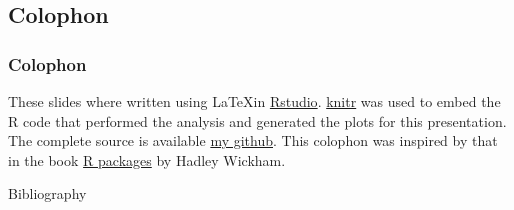 \documentclass{beamer}\usepackage{knitr}
\begin{document}
\subsection{Colophon}

\begin{frame}
\frametitle{Colophon}

These slides where written using \LaTeX in \href{http://www.rstudio.com/ide/}{Rstudio}. \href{http://yihui.name/knitr/}{knitr} was used to embed the R code that performed the analysis and generated the plots for this presentation. The complete source is available \href{https://github.com/Armadilloa16/LBT\_interview\_presentation}{my github}. This colophon was inspired by that in the book \href{http://r-pkgs.had.co.nz/intro.html\#intro-colophon}{R packages} by Hadley Wickham.

\end{frame}



\begin{frame}{Bibliography}


\end{frame}
\end{document}
